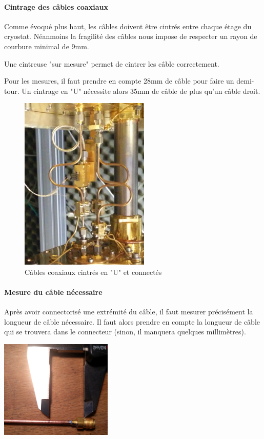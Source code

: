 \paragraph*{Cintrage des câbles coaxiaux} Comme évoqué plus haut, les câbles doivent être cintrés entre chaque étage du cryostat. Néanmoins la fragilité des câbles nous impose de respecter un rayon de courbure minimal de 9mm.

Une cintreuse "sur mesure" permet de cintrer les câble correctement.

Pour les mesures, il faut prendre en compte 28mm de câble pour faire un demi-tour. Un cintrage en "U" nécessite alors 35mm de câble de plus qu'un câble droit.

\begin{figure}[h]
    \begin{center}
        \includegraphics[width=0.55\textwidth]{Images/Coax/cintrage}
        \caption{Câbles coaxiaux cintrés en "U" et connectés}
        \label{coax_cintrage}
    \end{center}
\end{figure}

\paragraph*{Mesure du câble nécessaire} Après avoir connectorisé une extrémité du câble, il faut mesurer précisément la longueur de câble nécessaire. Il faut alors prendre en compte la longueur de câble qui se trouvera dans le connecteur (sinon, il manquera quelques millimètres).

\begin{center}
    \includegraphics[width=0.40\textwidth]{Images/Coax/mesure}
    \label{coax_mesure}
\end{center}



